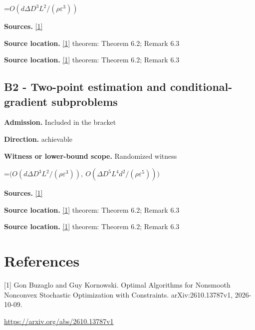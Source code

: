 \documentclass[10pt,a4paper]{article}
\newcommand{\AtlasMath}[1]{\par\begingroup\centering\setbox0=\hbox{$\displaystyle #1$}\ifdim\wd0>1.4\linewidth\typeout{ATLAS WIDE FORMULA: \the\wd0}\fi\ifdim\wd0>\linewidth\resizebox{\linewidth}{!}{\box0}\else\box0\fi\par\endgroup}
\begin{document}
\AtlasMath{O(d\Delta D^3L^2/(\rho\varepsilon^3))}
\textbf{Sources.} \href{https://arxiv.org/abs/2610.13787v1}{[1]}

\textbf{Source location.} \href{https://arxiv.org/abs/2610.13787v1}{[1]} theorem: Theorem 6.2; Remark 6.3

\textbf{Source location.} \href{https://arxiv.org/abs/2610.13787v1}{[1]} theorem: Theorem 6.2; Remark 6.3

\subsection{B2 - Two-point estimation and conditional-gradient subproblems}
\textbf{Admission.} Included in the bracket

\textbf{Direction.} achievable

\textbf{Witness or lower-bound scope.} Randomized witness

\AtlasMath{\bigl(O(d\Delta D^3L^2/(\rho\varepsilon^3)),\ O(\Delta D^5L^4d^2/(\rho\varepsilon^5))\bigr)}
\textbf{Sources.} \href{https://arxiv.org/abs/2610.13787v1}{[1]}

\textbf{Source location.} \href{https://arxiv.org/abs/2610.13787v1}{[1]} theorem: Theorem 6.2; Remark 6.3

\textbf{Source location.} \href{https://arxiv.org/abs/2610.13787v1}{[1]} theorem: Theorem 6.2; Remark 6.3

\section{References}
[1] Gon Buzaglo and Guy Kornowski. Optimal Algorithms for Nonsmooth Nonconvex Stochastic Optimization with Constraints. arXiv:2610.13787v1, 2026-10-09.

\url{https://arxiv.org/abs/2610.13787v1}
\end{document}
